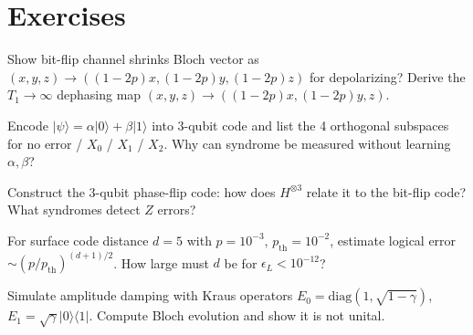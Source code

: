 \section{Exercises}
\begin{exercise}
Show bit-flip channel shrinks Bloch vector as $(x,y,z)\to((1-2p)x,(1-2p)y,(1-2p)z)$ for depolarizing? Derive the $T_1\to\infty$ dephasing map $(x,y,z)\to((1-2p)x,(1-2p)y,z)$.
\end{exercise}
\begin{exercise}
Encode $\lvert\psi\rangle=\alpha\lvert0\rangle+\beta\lvert1\rangle$ into $3$-qubit code and list the 4 orthogonal subspaces for no error / $X_0$ / $X_1$ / $X_2$. Why can syndrome be measured without learning $\alpha,\beta$?
\end{exercise}
\begin{exercise}
Construct the $3$-qubit phase-flip code: how does $H^{\otimes3}$ relate it to the bit-flip code? What syndromes detect $Z$ errors?
\end{exercise}
\begin{exercise}
For surface code distance $d=5$ with $p=10^{-3}$, $p_{\text{th}}=10^{-2}$, estimate logical error $\sim(p/p_{\text{th}})^{(d+1)/2}$. How large must $d$ be for $\epsilon_L<10^{-12}$?
\end{exercise}
\begin{exercise}
Simulate amplitude damping with Kraus operators $E_0=\mathrm{diag}(1,\sqrt{1-\gamma})$, $E_1=\sqrt\gamma\lvert0\rangle\langle1\rvert$. Compute Bloch evolution and show it is not unital.
\end{exercise}
